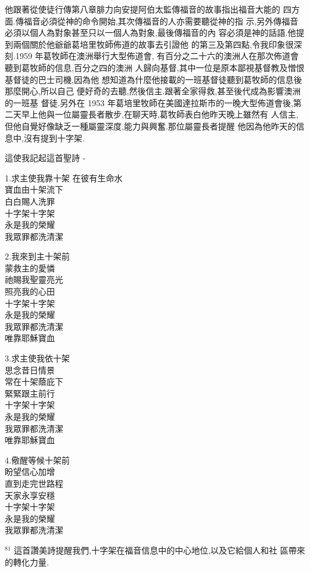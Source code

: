 \documentclass{book}
\begin{document}
他跟著從使徒行傳第八章腓力向安提阿伯太監傳福音的故事指出福音大能的 四方面.傳福音必須從神的命令開始,其次傳福音的人亦需要聽從神的指 示,另外傳福音必須以個人為對象甚至只以一個人為對象,最後傳福音的內 容必須是神的話語.他提到兩個關於他爺爺葛培里牧師佈道的故事去引證他 的第三及第四點,令我印象很深刻.1959 年葛牧師在澳洲舉行大型佈道會, 有百分之二十六的澳洲人在那次佈道會聽到葛牧師的信息,百分之四的澳洲
人歸向基督,其中一位是原本鄙視基督教及憎恨基督徒的巴士司機,因為他 想知道為什麼他接載的一班基督徒聽到葛牧師的信息後那麼開心,所以自己 便好奇的去聽,然後信主.跟著全家得救,甚至後代成為影響澳洲的一班基 督徒.另外在 1953 年葛培里牧師在美國達拉斯市的一晚大型佈道會後,第 二天早上他與一位屬靈長者散步,在聊天時,葛牧師表白他昨天晚上雖然有
人信主,但他自覺好像缺乏一種屬靈深度,能力與興奮.那位屬靈長者提醒 他因為他昨天的信息中,沒有提到十字架.

這使我記起這首聖詩 -

1.求主使我靠十架 在彼有生命水 \\
寶血由十架流下 \\
白白賜人洗罪 \\
十字架十字架 \\
永是我的榮耀 \\
我眾罪都洗清潔

2.我來到主十架前 \\
蒙救主的愛憐 \\
祂賜我聖靈亮光 \\
照亮我的心田 \\
十字架十字架 \\
永是我的榮耀 \\
我眾罪都洗清潔 \\
唯靠耶穌寶血

3.求主使我依十架 \\
思念昔日情景 \\
常在十架蔭庇下 \\
緊緊跟主前行 \\
十字架十字架 \\
永是我的榮耀 \\
我眾罪都洗清潔 \\
唯靠耶穌寶血

4.儆醒等候十架前 \\
盼望信心加增 \\
直到走完世路程 \\
天家永享安穩 \\
十字架十字架 \\
永是我的榮耀 \\
我眾罪都洗清潔

$^{81}$
這首讚美詩提醒我們,十字架在福音信息中的中心地位,以及它給個人和社 區帶來的轉化力量.
\end{document}
